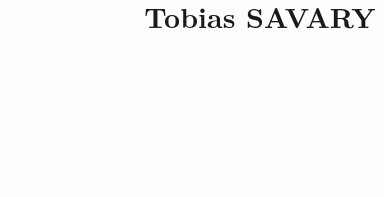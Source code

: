 \documentclass[9pt, oneside, a4paper, titlepage]{extarticle}
\title{Tobias SAVARY}
\date{}
\begin{document}
    
    \begin{tcolorbox}
        \begin{minipage}{0.3\linewidth}
            \hspace*{1cm}
        \end{minipage}%
        \hspace{1cm}%
        \begin{minipage}{0.6\linewidth}
            \begin{center}
                \Huge{\textcolor{white}{Tobias SAVARY}} \\
                \vspace*{0.5cm}
                \Large{\textcolor{white}{\emph{Etudiant en Génie Informatique \\Université de Technologie de Compiègne (UTC) \\}}}
                \vspace*{0.5cm}
                \Large{\textcolor{white}{\emph{Recherche d'un stage de 6 mois \\en tant qu'assistant ingénieur en septembre 2023}}}
            \end{center}
        \end{minipage}%
    \end{tcolorbox}
\end{document}
